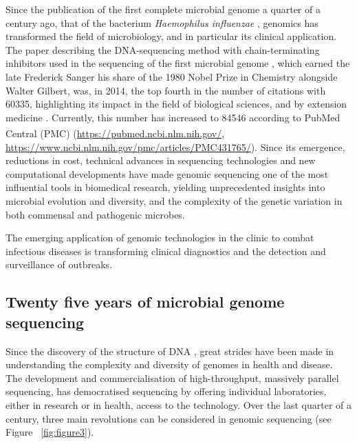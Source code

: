 Since the publication of the first complete microbial genome a quarter of a century ago, that of the bacterium \textit{Haemophilus influenzae} \citep{hood_dna_1996}, genomics has transformed the field of microbiology, and in particular its clinical application. The paper describing the DNA-sequencing method with chain-terminating inhibitors used in the sequencing of the first microbial genome \citep{sanger_dna_1977}, which earned the late Frederick Sanger his share of the 1980 Nobel Prize in Chemistry alongside Walter Gilbert, was, in 2014, the top fourth in the number of citations with 60335, highlighting its impact in the field of biological sciences, and by extension medicine \citep{van_noorden_top_2014}. Currently, this number has increased to 84546 according to PubMed Central\textsuperscript{\small\textregistered} (PMC) (\url{https://pubmed.ncbi.nlm.nih.gov/, https://www.ncbi.nlm.nih.gov/pmc/articles/PMC431765/}). Since its emergence, reductions in cost, technical advances in sequencing technologies and new computational developments have made genomic sequencing one of the most influential tools in biomedical research, yielding unprecedented insights into microbial evolution and diversity, and the complexity of the genetic variation in both commensal and pathogenic microbes. 

The emerging application of genomic technologies in the clinic to combat infectious diseases is transforming clinical diagnostics and the detection and surveillance of outbreaks. 

\subsection{Twenty five years of microbial genome sequencing} \label{ssec:sequencing}

Since the discovery of the structure of DNA \citep{watson_molecular_1953}, great strides have been made in understanding the complexity and diversity of genomes in health and disease. The development and commercialisation of high-throughput, massively parallel sequencing, has democratised sequencing by offering individual laboratories, either in research or in health, access to the technology. Over the last quarter of a century, three main revolutions can be considered in genomic sequencing (see Figure ~\ref{fig:figure3}).

